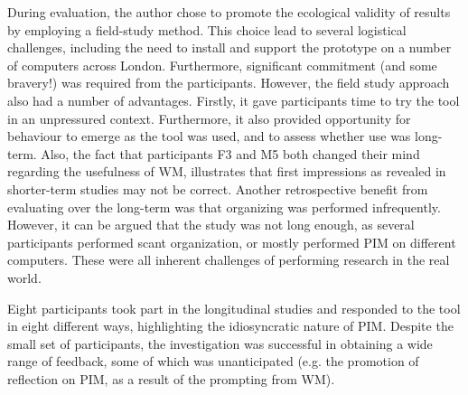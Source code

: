 During evaluation, the author chose to promote the ecological validity of results by employing a field-study method.  This choice lead to several logistical challenges, including the need to install and support the prototype on a number of computers across London.  Furthermore, significant commitment (and some bravery!) was required from the participants. However, the field study approach also had a number of advantages.   Firstly, it gave participants time to try the tool in an unpressured context.  Furthermore, it also provided opportunity for behaviour to emerge as the tool was used, and to assess whether use was long-term.  Also, the fact that participants F3 and M5 both changed their mind regarding the usefulness of WM, illustrates that first impressions as revealed in shorter-term studies may not be correct.  Another retrospective benefit from evaluating over the long-term was that organizing was performed infrequently.  However, it can be argued that the study was not long enough, as several participants performed scant organization, or mostly performed PIM on different computers.  These were all inherent challenges of performing research in the real world.









Eight participants took part in the longitudinal studies and responded to the tool in eight different ways, highlighting the idiosyncratic nature of PIM.  Despite the small set of participants, the investigation was successful in obtaining a wide range of feedback, some of which was unanticipated (e.g. the promotion of reflection on PIM, as a result of the prompting from WM). %




